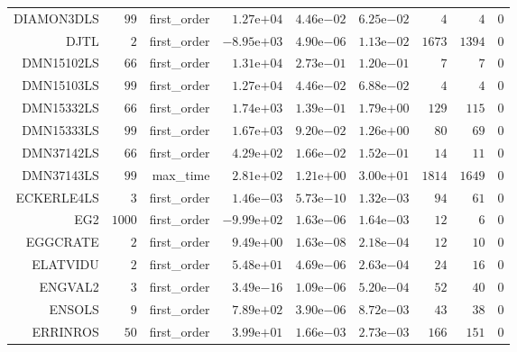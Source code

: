 \begin{longtable}{rrrrrrrrr}
DIAMON3DLS & \(    99\) & first\_order & \( 1.27\)e\(+04\) & \( 4.46\)e\(-02\) & \( 6.25\)e\(-02\) & \(     4\) & \(     4\) & \(     0\) \\
DJTL & \(     2\) & first\_order & \(-8.95\)e\(+03\) & \( 4.90\)e\(-06\) & \( 1.13\)e\(-02\) & \(  1673\) & \(  1394\) & \(     0\) \\
DMN15102LS & \(    66\) & first\_order & \( 1.31\)e\(+04\) & \( 2.73\)e\(-01\) & \( 1.20\)e\(-01\) & \(     7\) & \(     7\) & \(     0\) \\
DMN15103LS & \(    99\) & first\_order & \( 1.27\)e\(+04\) & \( 4.46\)e\(-02\) & \( 6.88\)e\(-02\) & \(     4\) & \(     4\) & \(     0\) \\
DMN15332LS & \(    66\) & first\_order & \( 1.74\)e\(+03\) & \( 1.39\)e\(-01\) & \( 1.79\)e\(+00\) & \(   129\) & \(   115\) & \(     0\) \\
DMN15333LS & \(    99\) & first\_order & \( 1.67\)e\(+03\) & \( 9.20\)e\(-02\) & \( 1.26\)e\(+00\) & \(    80\) & \(    69\) & \(     0\) \\
DMN37142LS & \(    66\) & first\_order & \( 4.29\)e\(+02\) & \( 1.66\)e\(-02\) & \( 1.52\)e\(-01\) & \(    14\) & \(    11\) & \(     0\) \\
DMN37143LS & \(    99\) & max\_time & \( 2.81\)e\(+02\) & \( 1.21\)e\(+00\) & \( 3.00\)e\(+01\) & \(  1814\) & \(  1649\) & \(     0\) \\
ECKERLE4LS & \(     3\) & first\_order & \( 1.46\)e\(-03\) & \( 5.73\)e\(-10\) & \( 1.32\)e\(-03\) & \(    94\) & \(    61\) & \(     0\) \\
EG2 & \(  1000\) & first\_order & \(-9.99\)e\(+02\) & \( 1.63\)e\(-06\) & \( 1.64\)e\(-03\) & \(    12\) & \(     6\) & \(     0\) \\
EGGCRATE & \(     2\) & first\_order & \( 9.49\)e\(+00\) & \( 1.63\)e\(-08\) & \( 2.18\)e\(-04\) & \(    12\) & \(    10\) & \(     0\) \\
ELATVIDU & \(     2\) & first\_order & \( 5.48\)e\(+01\) & \( 4.69\)e\(-06\) & \( 2.63\)e\(-04\) & \(    24\) & \(    16\) & \(     0\) \\
ENGVAL2 & \(     3\) & first\_order & \( 3.49\)e\(-16\) & \( 1.09\)e\(-06\) & \( 5.20\)e\(-04\) & \(    52\) & \(    40\) & \(     0\) \\
ENSOLS & \(     9\) & first\_order & \( 7.89\)e\(+02\) & \( 3.90\)e\(-06\) & \( 8.72\)e\(-03\) & \(    43\) & \(    38\) & \(     0\) \\
ERRINROS & \(    50\) & first\_order & \( 3.99\)e\(+01\) & \( 1.66\)e\(-03\) & \( 2.73\)e\(-03\) & \(   166\) & \(   151\) & \(     0\) \\

\end{longtable}
